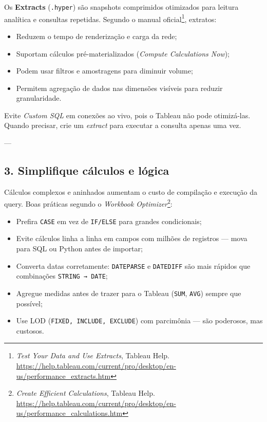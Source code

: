Os \textbf{Extracts} (\texttt{.hyper}) são snapshots comprimidos otimizados para leitura analítica e consultas repetidas.  
Segundo o manual oficial\footnote{\textit{Test Your Data and Use Extracts}, Tableau Help. \url{https://help.tableau.com/current/pro/desktop/en-us/performance_extracts.htm}}, extratos:
\begin{itemize}[leftmargin=*]
  \item Reduzem o tempo de renderização e carga da rede;  
  \item Suportam cálculos pré-materializados (\textit{Compute Calculations Now});  
  \item Podem usar filtros e amostragens para diminuir volume;  
  \item Permitem agregação de dados nas dimensões visíveis para reduzir granularidade.  
\end{itemize}

Evite \textit{Custom SQL} em conexões ao vivo, pois o Tableau não pode otimizá-las.  
Quando precisar, crie um \textit{extract} para executar a consulta apenas uma vez.

---

\subsection{3. Simplifique cálculos e lógica}

Cálculos complexos e aninhados aumentam o custo de compilação e execução da query.  
Boas práticas segundo o \textit{Workbook Optimizer}\footnote{\textit{Create Efficient Calculations}, Tableau Help. \url{https://help.tableau.com/current/pro/desktop/en-us/performance_calculations.htm}}:
\begin{itemize}[leftmargin=*]
  \item Prefira \texttt{CASE} em vez de \texttt{IF/ELSE} para grandes condicionais;  
  \item Evite cálculos linha a linha em campos com milhões de registros — mova para SQL ou Python antes de importar;  
  \item Converta datas corretamente: \texttt{DATEPARSE} e \texttt{DATEDIFF} são mais rápidos que combinações \texttt{STRING → DATE};  
  \item Agregue medidas antes de trazer para o Tableau (\texttt{SUM}, \texttt{AVG}) sempre que possível;  
  \item Use LOD (\texttt{FIXED, INCLUDE, EXCLUDE}) com parcimônia — são poderosos, mas custosos.  
\end{itemize}

